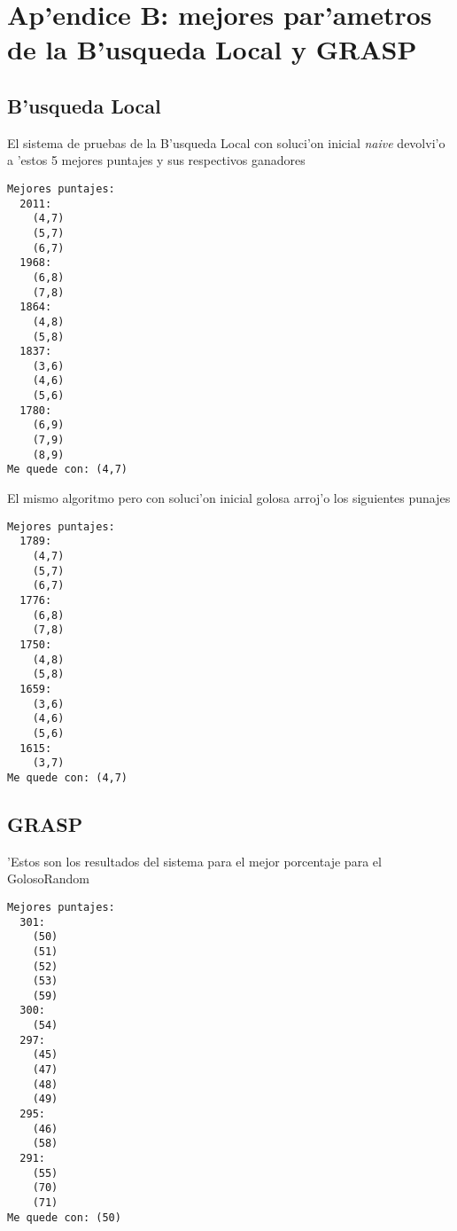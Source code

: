 \section{Ap'endice B: mejores par'ametros de la B'usqueda Local y GRASP}
\subsection{B'usqueda Local}
El sistema de pruebas de la B'usqueda Local con soluci'on inicial \emph{naive} devolvi'o a 'estos 5 mejores puntajes y sus respectivos ganadores
\begin{verbatim}
Mejores puntajes:
  2011:
    (4,7)
    (5,7)
    (6,7)
  1968:
    (6,8)
    (7,8)
  1864:
    (4,8)
    (5,8)
  1837:
    (3,6)
    (4,6)
    (5,6)
  1780:
    (6,9)
    (7,9)
    (8,9)
Me quede con: (4,7)
\end{verbatim}

El mismo algoritmo pero con soluci'on inicial golosa arroj'o los siguientes punajes
\begin{verbatim}
Mejores puntajes:
  1789:
    (4,7)
    (5,7)
    (6,7)
  1776:
    (6,8)
    (7,8)
  1750:
    (4,8)
    (5,8)
  1659:
    (3,6)
    (4,6)
    (5,6)
  1615:
    (3,7)
Me quede con: (4,7)
\end{verbatim}

\subsection{GRASP}
'Estos son los resultados del sistema para el mejor porcentaje para el GolosoRandom
\begin{verbatim}
Mejores puntajes:
  301:
    (50)
    (51)
    (52)
    (53)
    (59)
  300:
    (54)
  297:
    (45)
    (47)
    (48)
    (49)
  295:
    (46)
    (58)
  291:
    (55)
    (70)
    (71)
Me quede con: (50)
\end{verbatim}
